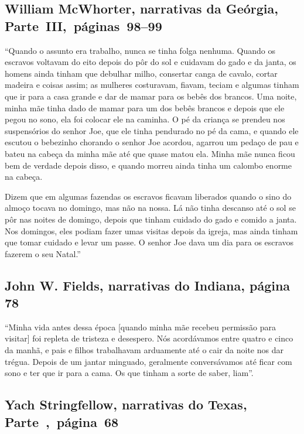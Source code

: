 \subsection{William McWhorter, narrativas da Geórgia, Parte~III,~páginas~98--99}
\label{ref188}

``Quando o assunto era trabalho, nunca se tinha folga nenhuma. Quando os
escravos voltavam do eito depois do pôr do sol e cuidavam do gado e da
janta, os homens ainda tinham que debulhar milho, consertar canga de
cavalo, cortar madeira e coisas assim; as mulheres costuravam, fiavam,
teciam e algumas tinham que ir para a casa grande e dar de mamar para os
bebês dos brancos. Uma noite, minha mãe tinha dado de mamar para um dos
bebês brancos e depois que ele pegou no sono, ela foi colocar ele na
caminha. O pé da criança se prendeu nos suspensórios do senhor Joe, que
ele tinha pendurado no pé da cama, e quando ele escutou o bebezinho
chorando o senhor Joe acordou, agarrou um pedaço de pau e bateu na
cabeça da minha mãe até que quase matou ela. Minha mãe nunca ficou bem
de verdade depois disso, e quando morreu ainda tinha um calombo enorme
na cabeça.

Dizem que em algumas fazendas os escravos ficavam liberados quando o
sino do almoço tocava no domingo, mas não na nossa. Lá não tinha
descanso até o sol se pôr nas noites de domingo, depois que tinham
cuidado do gado e comido a janta. Nos domingos, eles podiam fazer umas
visitas depois da igreja, mas ainda tinham que tomar cuidado e levar um
passe. O senhor Joe dava um dia para os escravos fazerem o seu Natal.''

\subsection{John W. Fields, narrativas do Indiana, página 78} \label{ref89}

``Minha vida antes dessa época {[}quando minha mãe recebeu permissão
para visitar{]} foi repleta de tristeza e desespero. Nós acordávamos
entre quatro e cinco da manhã, e pais e filhos trabalhavam arduamente
até o cair da noite nos dar trégua. Depois de um jantar minguado,
geralmente conversávamos até ficar com sono e ter que ir para a cama. Os
que tinham a sorte de saber, liam''.

\subsection{Yach Stringfellow, narrativas do Texas, Parte~,~página~68}
\label{ref254} 

